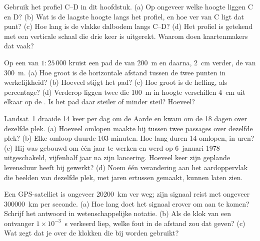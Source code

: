 \begin{exercise}[$\star\star$]\label{exo:g9:maps-of-the-earth:7}
Gebruik het profiel C--D in dit hoofdstuk. (a) Op ongeveer welke hoogte
liggen C en D? (b) Wat is de laagste hoogte langs het profiel, en hoe ver
van C ligt dat punt? (c) Hoe lang is de vlakke dalbodem langs C--D? (d) Het
profiel is getekend met een verticale schaal die drie keer is uitgerekt.
Waarom doen kaartenmakers dat vaak?
\end{exercise}

\begin{exercise}[$\star\star$]\label{exo:g9:maps-of-the-earth:8}
Op een  van $1 : 25\,000$ kruist een pad de  van \qty{200}{m}
en daarna, \qty{2}{cm} verder, de  van \qty{300}{m}. (a) Hoe groot
is de horizontale afstand tussen de twee punten in werkelijkheid?
(b) Hoeveel stijgt het pad? (c) Hoe groot is de helling, als percentage?
(d) Verderop liggen twee  die \qty{100}{m} in hoogte
verschillen \qty{4}{cm} uit elkaar op de . Is het pad daar steiler of
minder steil? Hoeveel?
\end{exercise}

\begin{exercise}[$\star\star$]\label{exo:g9:maps-of-the-earth:9}
Landsat~1 draaide 14 keer per dag om de Aarde en kwam om de 18 dagen over
dezelfde plek. (a) Hoeveel omlopen maakte hij tussen twee passages over
dezelfde plek? (b) Elke omloop duurde 103 minuten. Hoe lang duren
14 omlopen, in uren? (c) Hij was gebouwd om één jaar te werken en werd op
6~januari 1978 uitgeschakeld, vijfenhalf jaar na zijn lancering. Hoeveel
keer zijn geplande levensduur heeft hij gewerkt? (d) Noem één verandering
aan het aardoppervlak die beelden van dezelfde plek, met jaren ertussen
gemaakt, kunnen laten zien.
\end{exercise}

\begin{exercise}[$\star\star$]\label{exo:g9:maps-of-the-earth:10}
Een GPS-satelliet is ongeveer \qty{20200}{km} ver weg; zijn signaal reist
met ongeveer \qty{300000}{km} per seconde. (a) Hoe lang doet het signaal
erover om aan te komen? Schrijf het antwoord in wetenschappelijke notatie.
(b) Als de klok van een ontvanger $1 \times 10^{-3}$~s verkeerd liep, welke
fout in de afstand zou dat geven? (c) Wat zegt dat je over de klokken die
bij  worden gebruikt?
\end{exercise}

